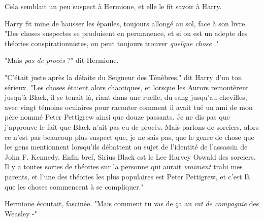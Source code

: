 Cela semblait un peu suspect à Hermione, et elle le fit savoir à Harry.

Harry fit mine de hausser les épaules, toujours allongé au sol, face à son livre. "Des choses suspectes se produisent en permanence, et si on est un adepte des théories conspirationnistes, on peut toujours trouver \emph{quelque chose} ."

"Mais \emph{pas de procès}  ?" dit Hermione.

"C'était juste après la défaite du Seigneur des Ténèbres," dit Harry d'un ton sérieux. "Les choses étaient alors chaotiques, et lorsque les Aurors remontèrent jusqu'à Black, il se tenait là, riant dans une ruelle, du sang jusqu'au chevilles, avec vingt témoins oculaires pour raconter comment il avait tué un ami de mon père nommé Peter Pettigrew ainsi que douze passants. Je ne dis pas que j'approuve le fait que Black n'ait pas eu de procès. Mais parlons de sorciers, alors ce n'est pas beaucoup plus suspect que, je ne sais pas, que le genre de chose que les gens mentionnent lorsqu'ils débattent au sujet de l'identité de l'assassin de John F. Kennedy. Enfin bref, Sirius Black est le Lee Harvey Oswald des sorciers. Il y a toutes sortes de théories sur la personne qui aurait \emph{vraiment}  trahi mes parents, et l'une des théories les plus populaires est Peter Pettigrew, et c'est là que les choses commencent à se compliquer."

Hermione écoutait, fascinée. "Mais comment tu vas de ça au \emph{rat}  \emph{de compagnie } des Weasley -"

